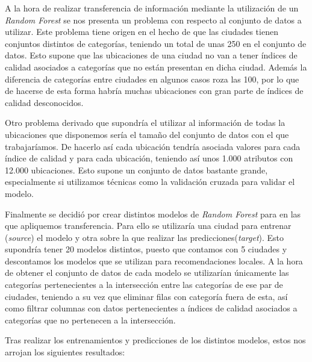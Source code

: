 A la hora de realizar transferencia de información mediante la utilización de un \textit{Random Forest} se nos presenta un problema con respecto al conjunto de datos a utilizar. Este problema tiene origen en el hecho de que las ciudades tienen conjuntos distintos de categorías, teniendo un total de unas 250 en el conjunto de datos. Esto supone que las ubicaciones de una ciudad no van a tener índices de calidad asociados a categorías que no están presentan en dicha ciudad. Además la diferencia de categorías entre ciudades en algunos casos roza las 100, por lo que de hacerse de esta forma habría muchas ubicaciones con gran parte de índices de calidad desconocidos.

Otro problema derivado que supondría el utilizar al información de todas la ubicaciones que disponemos sería el tamaño del conjunto de datos con el que trabajaríamos. De hacerlo así cada ubicación tendría asociada valores para cada índice de calidad y para cada ubicación, teniendo así unos 1.000 atributos con 12.000 ubicaciones. Esto supone un conjunto de datos bastante grande, especialmente si utilizamos técnicas como la validación cruzada para validar el modelo.

Finalmente se decidió por crear distintos modelos de \textit{Random Forest} para en las que apliquemos transferencia. Para ello se utilizaría una ciudad para entrenar (\textit{source}) el modelo y otra sobre la que realizar las predicciones(\textit{target}). Esto supondría tener 20 modelos distintos, puesto que contamos con 5 ciudades y descontamos los modelos que se utilizan para recomendaciones locales. A la hora de obtener el conjunto de datos de cada modelo se utilizarían únicamente las categorías pertenecientes a la intersección entre las categorías de ese par de ciudades, teniendo a su vez que eliminar filas con categoría fuera de esta, así como filtrar columnas con datos pertenecientes a índices de calidad asociados a categorías que no pertenecen a la intersección.

Tras realizar los entrenamientos y predicciones de los distintos modelos, estos nos arrojan los siguientes resultados:

